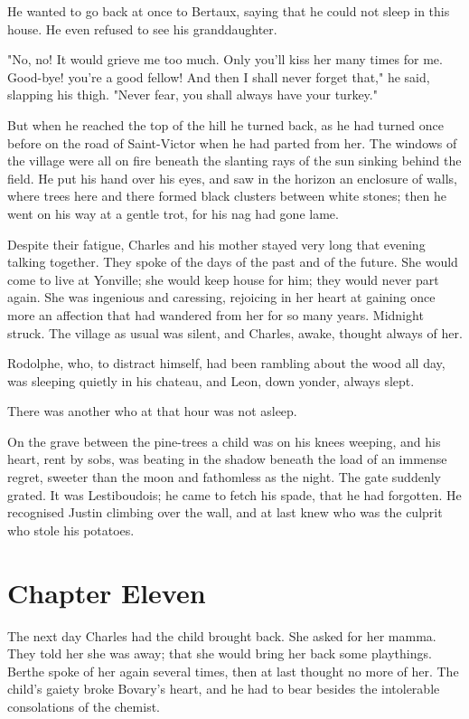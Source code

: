 \documentclass{tufte-book}
\begin{document}
He wanted to go back at once to Bertaux, saying that he could not sleep
in this house. He even refused to see his granddaughter.

"No, no! It would grieve me too much. Only you'll kiss her many times
for me. Good-bye! you're a good fellow! And then I shall never forget
that," he said, slapping his thigh. "Never fear, you shall always have
your turkey."

But when he reached the top of the hill he turned back, as he had turned
once before on the road of Saint-Victor when he had parted from her. The
windows of the village were all on fire beneath the slanting rays of the
sun sinking behind the field. He put his hand over his eyes, and saw
in the horizon an enclosure of walls, where trees here and there formed
black clusters between white stones; then he went on his way at a gentle
trot, for his nag had gone lame.

Despite their fatigue, Charles and his mother stayed very long that
evening talking together. They spoke of the days of the past and of the
future. She would come to live at Yonville; she would keep house for
him; they would never part again. She was ingenious and caressing,
rejoicing in her heart at gaining once more an affection that had
wandered from her for so many years. Midnight struck. The village as
usual was silent, and Charles, awake, thought always of her.

Rodolphe, who, to distract himself, had been rambling about the wood all
day, was sleeping quietly in his chateau, and Leon, down yonder, always
slept.

There was another who at that hour was not asleep.

On the grave between the pine-trees a child was on his knees weeping,
and his heart, rent by sobs, was beating in the shadow beneath the load
of an immense regret, sweeter than the moon and fathomless as the night.
The gate suddenly grated. It was Lestiboudois; he came to fetch his
spade, that he had forgotten. He recognised Justin climbing over the
wall, and at last knew who was the culprit who stole his potatoes.



\chapter{Chapter Eleven}

The next day Charles had the child brought back. She asked for her
mamma. They told her she was away; that she would bring her back some
playthings. Berthe spoke of her again several times, then at last
thought no more of her. The child's gaiety broke Bovary's heart, and he
had to bear besides the intolerable consolations of the chemist.
\end{document}
